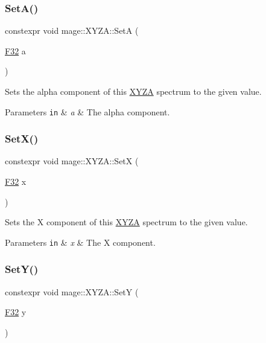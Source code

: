 \subsubsection{\texorpdfstring{Set\+A()}{SetA()}}
{\footnotesize\ttfamily constexpr void mage\+::\+X\+Y\+Z\+A\+::\+SetA (\begin{DoxyParamCaption}\item[{\mbox{\hyperlink{namespacemage_aa97e833b45f06d60a0a9c4fc22ae02c0}{F32}}}]{a }\end{DoxyParamCaption})\hspace{0.3cm}{\ttfamily [noexcept]}}

Sets the alpha component of this \mbox{\hyperlink{structmage_1_1_x_y_z_a}{X\+Y\+ZA}} spectrum to the given value.


\begin{DoxyParams}[1]{Parameters}
\mbox{\tt in}  & {\em a} & The alpha component. \\
\hline
\end{DoxyParams}
\mbox{\label{structmage_1_1_x_y_z_a_ae94002f96c710ac074672736e5f96a53}} 
\subsubsection{\texorpdfstring{Set\+X()}{SetX()}}
{\footnotesize\ttfamily constexpr void mage\+::\+X\+Y\+Z\+A\+::\+SetX (\begin{DoxyParamCaption}\item[{\mbox{\hyperlink{namespacemage_aa97e833b45f06d60a0a9c4fc22ae02c0}{F32}}}]{x }\end{DoxyParamCaption})\hspace{0.3cm}{\ttfamily [noexcept]}}

Sets the X component of this \mbox{\hyperlink{structmage_1_1_x_y_z_a}{X\+Y\+ZA}} spectrum to the given value.


\begin{DoxyParams}[1]{Parameters}
\mbox{\tt in}  & {\em x} & The X component. \\
\hline
\end{DoxyParams}
\mbox{\label{structmage_1_1_x_y_z_a_a2e1669b43888849e7b8ecff3619b3f61}} 
\subsubsection{\texorpdfstring{Set\+Y()}{SetY()}}
{\footnotesize\ttfamily constexpr void mage\+::\+X\+Y\+Z\+A\+::\+SetY (\begin{DoxyParamCaption}\item[{\mbox{\hyperlink{namespacemage_aa97e833b45f06d60a0a9c4fc22ae02c0}{F32}}}]{y }\end{DoxyParamCaption})\hspace{0.3cm}{\ttfamily [noexcept]}}

